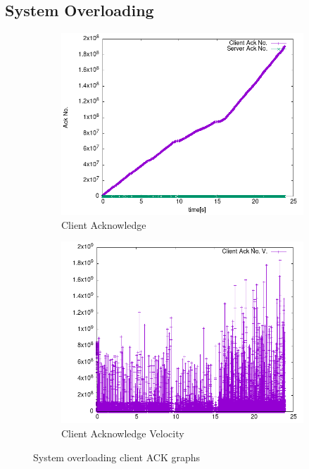 \documentclass{exam}
\begin{document}
\subsection{System Overloading}
\begin{figure}[H]
    \centering
    \begin{subfigure}[b]{0.4\textwidth}
        \centering
        \includegraphics[width=\textwidth]{overload-ack.png}
        \caption{Client Acknowledge}
    \end{subfigure}
    \hfill
    \begin{subfigure}[b]{0.4\textwidth}
        \centering
        \includegraphics[width=\textwidth]{overload-ack-vel.png}
        \caption{Client Acknowledge Velocity}
    \end{subfigure}
    \caption{System overloading client ACK graphs}
    \label{fig:sys-overloading}
\end{figure}
\end{document}
